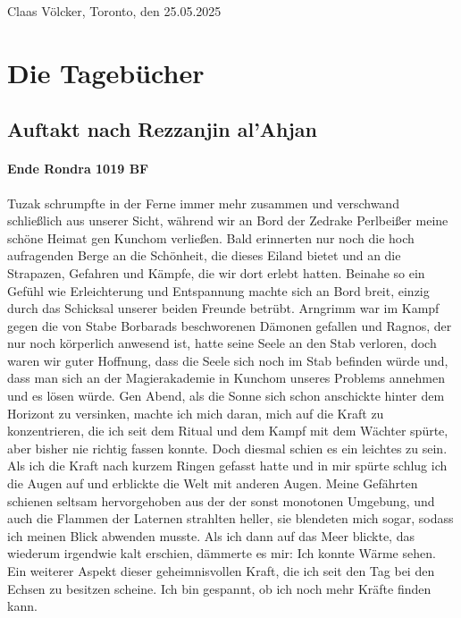\begin{flushright}
Claas Völcker, Toronto, den 25.05.2025
\end{flushright}


\section{Die Tagebücher}

\subsection{Auftakt nach Rezzanjin al'Ahjan}

\paragraph{Ende Rondra 1019 BF}
Tuzak schrumpfte in der Ferne immer mehr zusammen und verschwand schließlich aus unserer Sicht, während wir an Bord der Zedrake Perlbeißer meine schöne Heimat gen Kunchom verließen. Bald erinnerten nur noch die hoch aufragenden Berge an die Schönheit, die dieses Eiland bietet und an die Strapazen, Gefahren und Kämpfe, die wir dort erlebt hatten. Beinahe so ein Gefühl wie Erleichterung und Entspannung machte sich an Bord breit, einzig durch das Schicksal unserer beiden Freunde betrübt. Arngrimm war im Kampf gegen die von Stabe Borbarads beschworenen Dämonen gefallen und Ragnos, der nur noch körperlich anwesend ist, hatte seine Seele an den Stab verloren, doch waren wir guter Hoffnung, dass die Seele sich noch im Stab befinden würde und, dass man sich an der Magierakademie in Kunchom unseres Problems annehmen und es lösen würde. Gen Abend, als die Sonne sich schon anschickte hinter dem Horizont zu versinken, machte ich mich daran, mich auf die Kraft zu konzentrieren, die ich seit dem Ritual und dem Kampf mit dem Wächter spürte, aber bisher nie richtig fassen konnte. Doch diesmal schien es ein leichtes zu sein. Als ich die Kraft nach kurzem Ringen gefasst hatte und in mir spürte schlug ich die Augen auf und erblickte die Welt mit anderen Augen. Meine Gefährten schienen seltsam hervorgehoben aus der der sonst monotonen Umgebung, und auch die Flammen der Laternen strahlten heller, sie blendeten mich sogar, sodass ich meinen Blick abwenden musste. Als ich dann auf das Meer blickte, das wiederum irgendwie kalt erschien, dämmerte es mir: Ich konnte Wärme sehen. Ein weiterer Aspekt dieser geheimnisvollen Kraft, die ich seit den Tag bei den Echsen zu besitzen scheine. Ich bin gespannt, ob ich noch mehr Kräfte finden kann.

